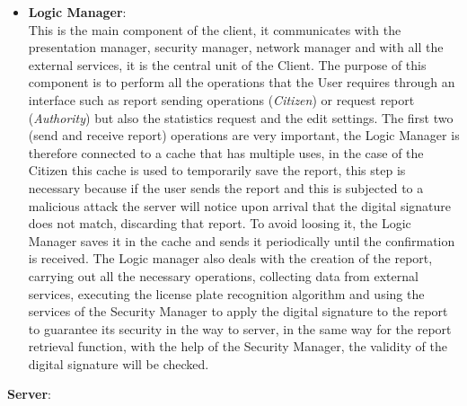 \documentclass{article}
\begin{document}
\begin{itemize}
\item \textbf{Logic Manager}: \\
This is the main component of the client, it communicates with the presentation manager, 
security manager, network manager and with all the external services, it is the central 
unit of the Client. The purpose of this component is to perform all the operations that 
the User requires through an interface such as report sending operations (\textit{Citizen}) 
or request report (\textit{Authority}) but also the statistics request and the edit settings. 
The first two (send and receive report) operations are very important, the Logic Manager 
is therefore connected to a cache that has multiple uses, in the case of the {Citizen} this 
cache is used to temporarily save the report, this step is necessary because if the user 
sends the report and this is subjected to a malicious attack the server will notice upon 
arrival that the digital signature does not match, discarding that report. To avoid loosing it, 
the Logic Manager saves it in the cache and sends it periodically until the confirmation is 
received. The Logic manager also deals with the creation of the report, carrying out all the 
necessary operations, collecting data from external services, executing the license plate 
recognition algorithm and using the services of the Security Manager to apply the digital 
signature to the report to guarantee its security in the way to server, in the same 
way for the report retrieval function, with the help of the Security Manager, the validity of 
the digital signature will be checked. 
\end{itemize}

\textbf{Server}:
\end{document}
